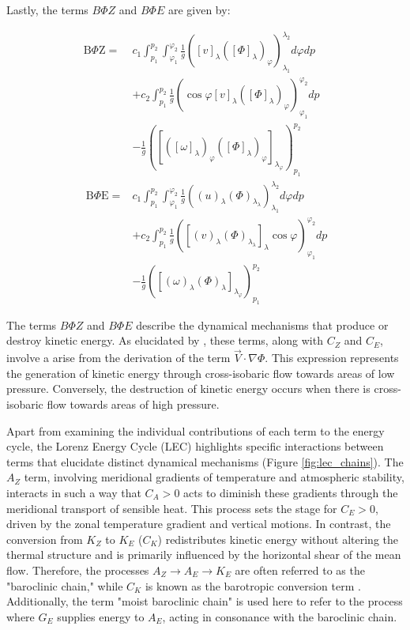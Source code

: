 Lastly, the terms $B\Phi Z$ and $B\Phi E$ are given by:

\begin{align}
\mathrm{B} \Phi \mathrm{Z}= & c_1 \int_{p_1}^{p_2} \int_{\varphi_1}^{\varphi_2} \frac{1}{g}\left([v]_\lambda\left([\Phi]_\lambda\right)_{\varphi}\right)_{\lambda_1}^{\lambda_2} d \varphi d p \nonumber \\
& +c_2 \int_{p_1}^{p_2} \frac{1}{g}\left(\cos \varphi[v]_\lambda\left([\Phi]_\lambda\right)_{\varphi}\right)_{\varphi_1}^{\varphi_2} d p  \\
& -\frac{1} {g}\left(\left[\left([\omega]_\lambda\right)_{\varphi}\left([\Phi]_\lambda\right)_{\varphi}\right]_{\lambda_{\varphi}}\right)_{p_1}^{p_2} \nonumber \\
\mathrm{~B} \Phi \mathrm{E}= & c_1 \int_{p_1}^{p_2} \int_{\varphi_1}^{\varphi_2} \frac{1}{g}\left((u)_\lambda(\Phi)_{\lambda_\lambda}\right)_{\lambda_1}^{\lambda_2} d \varphi d p \nonumber \\
& +c_2 \int_{p_1}^{p_2} \frac{1}{g}\left(\left[(v)_\lambda(\Phi)_{\lambda_\lambda}\right]_\lambda \cos \varphi\right)_{\varphi_1}^{\varphi_2} d p \\
& -\frac{1}{g}\left(\left[(\omega)_\lambda(\Phi)_\lambda\right]_{\lambda_{\varphi}}\right)_{p_1}^{p_2} \nonumber
\end{align}

The terms \(B\Phi Z\) and \(B\Phi E\) describe the dynamical mechanisms that produce or destroy kinetic energy. As elucidated by \citet{muench1965dynamics}, these terms, along with \(C_Z\) and \(C_E\), involve a arise from the derivation of the term \(\Vec{V} \cdot \nabla \Phi\). This expression represents the generation of kinetic energy through cross-isobaric flow towards areas of low pressure. Conversely, the destruction of kinetic energy occurs when there is cross-isobaric flow towards areas of high pressure.


Apart from examining the individual contributions of each term to the energy cycle, the Lorenz Energy Cycle (LEC) highlights specific interactions between terms that elucidate distinct dynamical mechanisms (Figure \ref{fig:lec_chains}). The \(A_Z\) term, involving meridional gradients of temperature and atmospheric stability, interacts in such a way that \(C_A > 0\) acts to diminish these gradients through the meridional transport of sensible heat. This process sets the stage for \(C_E > 0\), driven by the zonal temperature gradient and vertical motions. In contrast, the conversion from \(K_Z\) to \(K_E\) (\(C_K\)) redistributes kinetic energy without altering the thermal structure and is primarily influenced by the horizontal shear of the mean flow. Therefore, the processes \(A_Z \rightarrow A_E \rightarrow K_E\) are often referred to as the "baroclinic chain," while \(C_K\) is known as the barotropic conversion term \citep[e.g.]{michaelides1992spatial, veiga2013global, pezza2014large, okajima2021cyclonic}. Additionally, the term "moist baroclinic chain" is used here to refer to the process where \(G_E\) supplies energy to \(A_E\), acting in consonance with the baroclinic chain.


